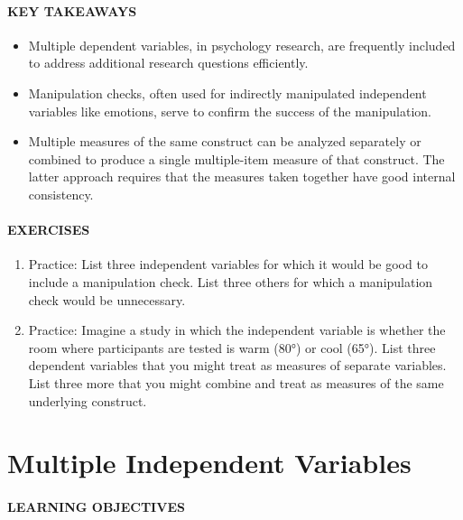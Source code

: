 \documentclass[
]{krantz}
\providecommand{\tightlist}{%
  \setlength{\itemsep}{0pt}\setlength{\parskip}{0pt}}
\begin{document}
\paragraph*{KEY TAKEAWAYS}\label{key-takeaways-14}

\begin{itemize}
\tightlist
\item
  Multiple dependent variables, in psychology research, are frequently included to address additional research questions efficiently.
\item
  Manipulation checks, often used for indirectly manipulated independent variables like emotions, serve to confirm the success of the manipulation.
\item
  Multiple measures of the same construct can be analyzed separately or combined to produce a single multiple-item measure of that construct. The latter approach requires that the measures taken together have good internal consistency.
\end{itemize}

\paragraph*{EXERCISES}\label{exercises-12}

\begin{enumerate}
\def\labelenumi{\arabic{enumi}.}
\tightlist
\item
  Practice: List three independent variables for which it would be good to include a manipulation check. List three others for which a manipulation check would be unnecessary.
\item
  Practice: Imagine a study in which the independent variable is whether the room where participants are tested is warm (80°) or cool (65°). List three dependent variables that you might treat as measures of separate variables. List three more that you might combine and treat as measures of the same underlying construct.
\end{enumerate}

\section{Multiple Independent Variables}\label{multiple-independent-variables}

\paragraph*{LEARNING OBJECTIVES}\label{learning-objectives-15}
\end{document}
